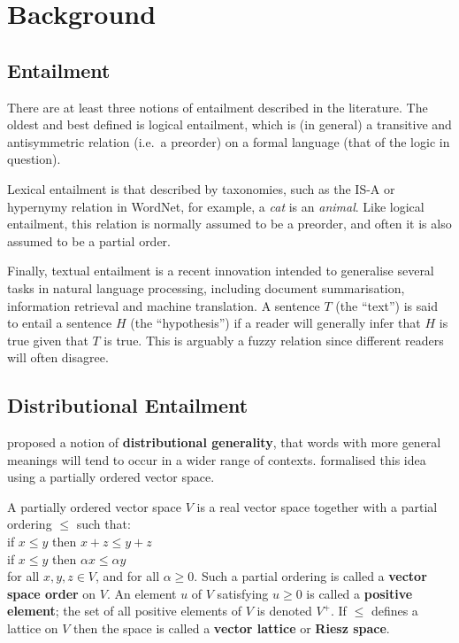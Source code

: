 \section{Background}

\subsection{Entailment}

There are at least three notions of entailment described in the
literature. The oldest and best defined is logical entailment, which
is (in general) a transitive and antisymmetric relation (i.e.~a
preorder) on a formal language (that of the logic in question).

Lexical entailment is that described by taxonomies, such as the IS-A
or hypernymy relation in WordNet, for example, a \emph{cat} is an
\emph{animal}. Like logical entailment, this relation is normally
assumed to be a preorder, and often it is also assumed to be a partial
order.

Finally, textual entailment is a recent innovation intended to
generalise several tasks in natural language processing, including
document summarisation, information retrieval and machine
translation. A sentence $T$ (the ``text'') is said to entail a
sentence $H$ (the ``hypothesis'') if a reader will generally infer
that $H$ is true given that $T$ is true. This is arguably a fuzzy
relation since different readers will often disagree.

\subsection{Distributional Entailment}

 proposed a notion of \textbf{distributional
  generality}, that words with more general meanings will tend to
occur in a wider range of contexts.  formalised
this idea using a partially ordered vector space.

\begin{definition}
  A partially ordered vector space $V$ is a real vector space together
  with a partial ordering $\le$ such that:
  \vspace{0.1cm}\\
  \indent if $x \le y$ then $x + z \le y + z$\\
  \indent if $x \le y$ then $\alpha x \le \alpha y$
  \vspace{0.1cm}\\
  for all $x,y,z \in V$, and for all $\alpha \ge 0$. Such a partial
  ordering is called a \textbf{vector space order} on $V$. An element
  $u$ of $V$ satisfying $u \ge 0$ is called a \textbf{positive
    element}; the set of all positive elements of $V$ is denoted
  $V^+$. If $\le$ defines a lattice on $V$ then the space is called a
  \textbf{vector lattice} or \textbf{Riesz space}.
\end{definition}

